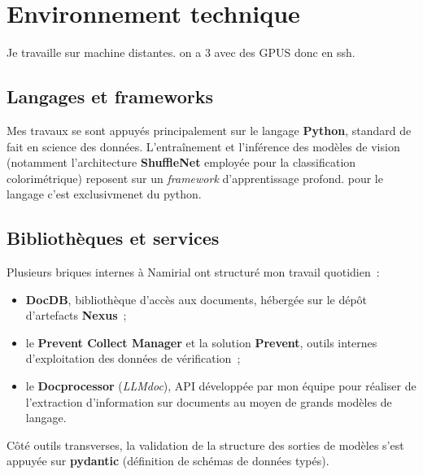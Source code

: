 \chapter{Environnement technique}\label{ch:env}
Je travaille sur machine distantes. on a 3 avec des GPUS donc en ssh.


\section{Langages et frameworks}

Mes travaux se sont appuyés principalement sur le langage \textbf{Python}, standard
de fait en science des données. L'entraînement et l'inférence des modèles de vision
(notamment l'architecture \textbf{ShuffleNet} employée pour la classification
colorimétrique) reposent sur un \emph{framework} d'apprentissage profond.
pour le langage c'est exclusivmenet du python.


\section{Bibliothèques et services}

Plusieurs briques internes à Namirial ont structuré mon travail quotidien~:
\begin{itemize}
  \item \textbf{DocDB}, bibliothèque d'accès aux documents, hébergée sur le dépôt
        d'artefacts \textbf{Nexus}~;
  \item le \textbf{Prevent Collect Manager} et la solution \textbf{Prevent},
        outils internes d'exploitation des données de vérification~;
  \item le \textbf{Docprocessor} (\emph{LLMdoc}), API développée par mon équipe pour
        réaliser de l'extraction d'information sur documents au moyen de grands
        modèles de langage.
\end{itemize}

Côté outils transverses, la validation de la structure des sorties de modèles s'est
appuyée sur \textbf{pydantic} (définition de schémas de données typés).


